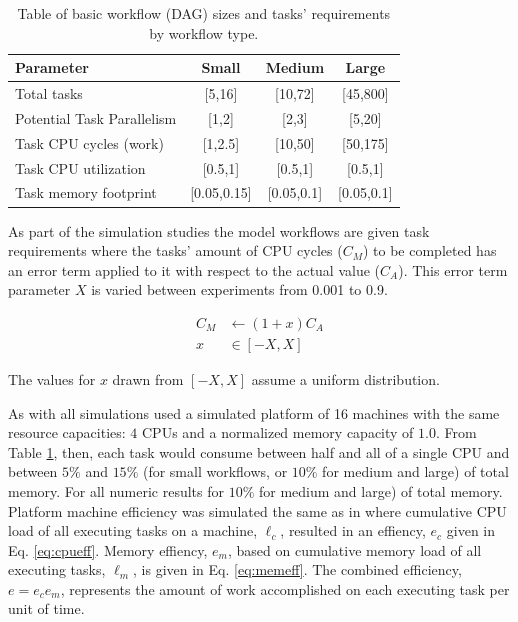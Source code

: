 \documentclass[10pt]{csce}
\begin{document}
\begin{table}
	\begin{tabular}{|l|c|c|c|}
		\hline
		\textbf{Parameter}	& \textbf{Small}	& \textbf{Medium}	& \textbf{Large} \\
		\hline
		Total tasks				& [5,16]	& [10,72]	& [45,800] \\
		Potential Task Parallelism	& [1,2]	& [2,3]		& [5,20] \\
		Task CPU cycles (work)	& [1,2.5]	& [10,50]	& [50,175] \\
		Task CPU utilization	& [0.5,1]	& [0.5,1]	& [0.5,1] \\
		Task memory footprint	& [0.05,0.15] & [0.05,0.1] & [0.05,0.1] \\
		\hline
	\end{tabular}
	\caption{Table of basic workflow (DAG) sizes and tasks' requirements by
		workflow type.}
	\label{tab:params}
\end{table}

As part of the simulation studies the model workflows are given task
requirements where the tasks' amount of CPU cycles ($C_M$) to be completed has
an error term applied to it with respect to the actual value ($C_A$).
This error term parameter $X$ is varied between experiments from 0.001 to 0.9.

\begin{equation}
\begin{split}
C_M & \leftarrow (1+x)C_A \\
x & \in [-X,X]
\end{split}
\end{equation}

\noindent The values for $x$ drawn from $[-X,X]$ assume a uniform distribution.

As with \cite{costmin} all simulations used a simulated platform of 16 machines
with the same resource capacities: $4$ CPUs and a normalized memory capacity of
$1.0$.  From Table \ref{tab:params}, then, each task would consume between half
and all of a single CPU and between $5\%$ and $15\%$ (for small workflows, or
$10\%$ for medium and large) of total memory.  For all numeric results for
$10\%$ for medium and large) of total memory.  Platform machine efficiency was
simulated the same as in \cite{costmin} where cumulative CPU load of all
executing tasks on a machine, $\ell_c$, resulted in an effiency, $e_c$ given in
Eq. \ref{eq:cpueff}.  Memory effiency, $e_m$, based on cumulative memory
load of all executing tasks, $\ell_m$, is given in Eq. \ref{eq:memeff}.
The combined efficiency, $e = e_c e_m$, represents the amount of work
accomplished on each executing task per unit of time.
\end{document}
